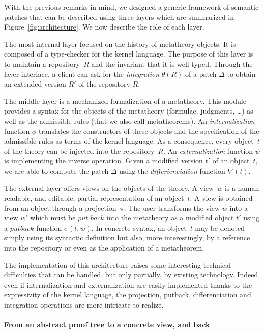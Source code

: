\documentclass{article}
\newcommand{\remtext}[1]{}
\begin{document}
With the previous remarks in mind, we designed a generic framework of semantic
patches that can be described using three layers which are summarized in 
Figure~\ref{fig:architecture}. We now describe the role of each layer.

The most internal layer focused on the history of metatheory
objects. It is composed of a type-checker for the kernel language. The
purpose of this layer is to maintain a repository~$R$ and the
invariant that it is well-typed. Through the layer interface, a client
can ask for the \textit{integration} $\theta(R)$ of a patch $\Delta$
to obtain an extended version $R'$ of the repository $R$.

The middle layer is a mechanized formalization of a metatheory. This
module provides a syntax for the objects of the metatheory (formulae,
judgments, \ldots) as well as the admissible rules (that we also call
metatheorems).  An \textit{internalization} function $\phi$ translates
the constructors of these objects and the specification of the
admissible rules as terms of the kernel language. As a consequence,
every object~$t$ of the theory can be injected into the
repository~$R$. An \textit{externalization} function $\psi$ is
implementing the inverse operation. Given a modified version $t'$ of
an object~$t$, we are able to compute the patch $\Delta$ using
the \textit{differienciation} function $\nabla(t)$. 

The external layer offers views on the objects of the theory. A
view~$w$ is a human readable, and editable, partial representation of
an object~$t$. A view is obtained from an object through a
projection~$\pi$.  The user transforms the view $w$ into a view $w'$
which must be $\textit{put back}$ into the metatheory as a modified
object $t'$ using a $\textit{putback}$ function $\sigma(t, w)$.  In
concrete syntax, an object~$t$ may be denoted simply using its
syntactic definition but also, more interestingly, by a reference into
the repository or even as the application of a metatheorem.

The implementation of this architecture raises some interesting
technical difficulties that can be handled, but only partially, 
by existing technology. Indeed, even if internalization and 
externalization are easily implemented thanks to the expressivity
of the kernel language, the projection, putback, differenciation
and integration operations are more intricate to realize. 

\paragraph{From an abstract proof tree to a concrete view, and back}
\-
\remtext{Fri Jun 18, 2010  1:36 PM. Un arbre de preuves, ce n'est
  pas très pratique. Pourtant, c'est moralement sur cet objet 
  que s'opère le développement et non sur le code source, qui
  n'en est qu'une représentation. On justifie la nécessité de
  projection et on fait référence aux lentilles de Pierce pour
  expliquer $\sigma$ et $\pi$.}
\end{document}
